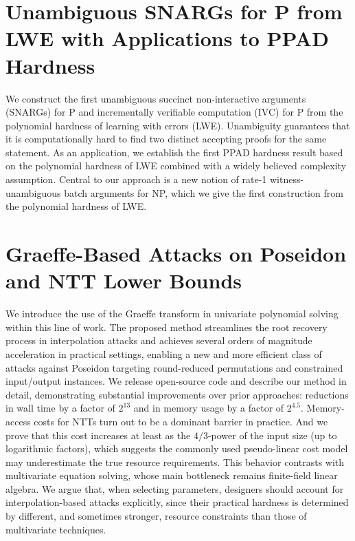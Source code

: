 \documentclass[11pt,oneside]{book}
\theoremstyle{definition}
\theoremstyle{remark}
\theoremstyle{plain}
\begin{document}
\section{\cite{cryptoeprint:2025/1913} Unambiguous SNARGs for P from LWE with Applications to PPAD Hardness
}
We construct the first unambiguous succinct non-interactive arguments (SNARGs) for P and incrementally verifiable computation (IVC) for P from the polynomial hardness of learning with errors (LWE). Unambiguity guarantees that it is computationally hard to find two distinct accepting proofs for the same statement. As an application, we establish the first PPAD hardness result based on the polynomial hardness of LWE combined with a widely believed complexity assumption. Central to our approach is a new notion of rate-1 witness-unambiguous batch arguments for NP, which we give the first construction from the polynomial hardness of LWE.

\section{\cite{cryptoeprint:2025/1916} Graeffe-Based Attacks on Poseidon and NTT Lower Bounds}
We introduce the use of the Graeffe transform in univariate polynomial solving within this line of work. The proposed method streamlines the root recovery process in interpolation attacks and achieves several orders of magnitude acceleration in practical settings, enabling a new and more efficient class of attacks against Poseidon targeting round-reduced permutations and constrained input/output instances. We release open-source code and describe our method in detail, demonstrating substantial improvements over prior approaches: reductions in wall time by a factor of $2^{13}$ and in memory usage by a factor of $2^{4.5}$. Memory-access costs for NTTs turn out to be a dominant barrier in practice. And we prove that this cost increases at least as the $4/3$-power of the input size (up to logarithmic factors), which suggests the commonly used pseudo-linear cost model may underestimate the true resource requirements. This behavior contrasts with multivariate equation solving, whose main bottleneck remains finite-field linear algebra. We argue that, when selecting parameters, designers should account for interpolation-based attacks explicitly, since their practical hardness is determined by different, and sometimes stronger, resource constraints than those of multivariate techniques.
\end{document}
